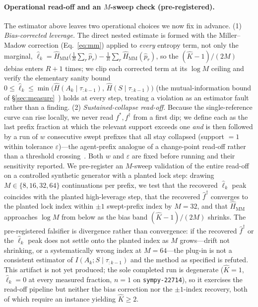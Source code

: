 \documentclass[11pt]{article}
\newcommand{\strat}{S}
\begin{document}
\paragraph{Operational read-off and an $M$-sweep check (pre-registered).}
The estimator above leaves two operational choices we now fix in advance. (1)
\emph{Bias-corrected leverage.} The direct nested estimate is formed with the
Miller--Madow correction (Eq.~\eqref{eq:mm}) applied to \emph{every} entropy term,
not only the marginal,
$\widehat\ell_k = \widehat H_{\mathrm{MM}}\!\big(\tfrac1R\sum_r\hat p_r\big)-\tfrac1R\sum_r \widehat H_{\mathrm{MM}}(\hat p_r)$,
so the $(\hat K-1)/(2M)$ debias enters $R+1$ times; we clip each corrected term at
its $\log M$ ceiling and verify the elementary sanity bound
$0\le\widehat\ell_k\le\min\big(\widehat H(A_k\mid\tau_{:k-1}),\,\widehat H(\strat\mid\tau_{:k-1})\big)$
(the mutual-information bound of \S\ref{sec:measure}~\citep{cover2006elements}) holds
at every step, treating a violation as an estimator fault rather than a finding. (2)
\emph{Sustained-collapse read-off.} Because the single-reference curve can rise
locally, we never read $f^\ast,f^\dagger$ from a first dip; we define each as the
last prefix fraction at which the relevant support exceeds one \emph{and} is then
followed by a run of $w$ consecutive swept prefixes that all stay collapsed
(support $=1$ within tolerance $\varepsilon$)---the agent-prefix analogue of a
change-point read-off rather than a threshold crossing~\citep{bigelow2024forking}.
Both $w$ and $\varepsilon$ are fixed before running and their sensitivity reported.
We pre-register an $M$-sweep validation of the entire read-off on a controlled
synthetic generator with a planted lock step: drawing $M\in\{8,16,32,64\}$
continuations per prefix, we test that the recovered $\widehat\ell_k$ peak coincides
with the planted high-leverage step, that the recovered $\widehat f^\dagger$
converges to the planted lock index within $\pm1$ swept-prefix index by $M=32$, and
that $\widehat H_{\mathrm{MM}}$ approaches $\log M$ from below as the bias band
$(\hat K-1)/(2M)$ shrinks. The pre-registered falsifier is divergence rather than
convergence: if the recovered $\widehat f^\dagger$ or the $\widehat\ell_k$ peak does
not settle onto the planted index as $M$ grows---drift not shrinking, or a
systematically wrong index at $M=64$---the plug-in is not a consistent estimator of
$I(A_k;\strat\mid\tau_{:k-1})$ and the method as specified is refuted. This artifact
is not yet produced; the sole completed run is degenerate ($\hat K=1$,
$\widehat\ell_k=0$ at every measured fraction, $n\!=\!1$ on \texttt{sympy-22714}), so
it exercises the read-off pipeline but neither the bias correction nor the
$\pm1$-index recovery, both of which require an instance yielding $\hat K\ge2$.
\end{document}
